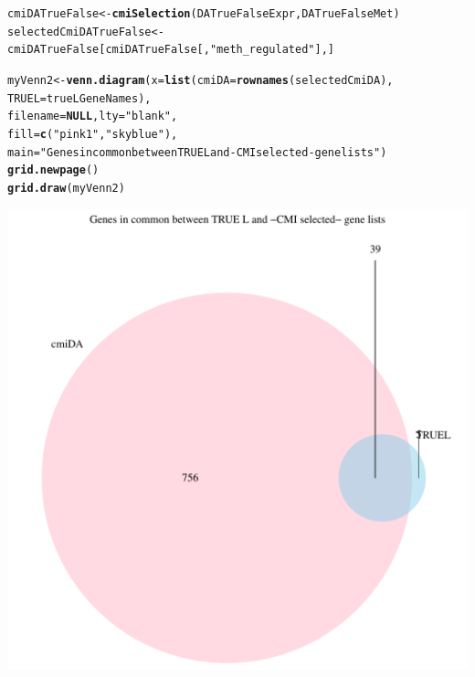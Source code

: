\documentclass[a4paper,10pt]{article}\usepackage[]{graphicx}\usepackage[]{color}
\makeatletter
\def\maxwidth{ %
  \ifdim\Gin@nat@width>\linewidth
    \linewidth
  \else
    \Gin@nat@width
  \fi
}
\newcommand{\hlstr}[1]{\textcolor[rgb]{0.192,0.494,0.8}{#1}}%
\newcommand{\hlstd}[1]{\textcolor[rgb]{0.345,0.345,0.345}{#1}}%
\newcommand{\hlkwa}[1]{\textcolor[rgb]{0.161,0.373,0.58}{\textbf{#1}}}%
\newcommand{\hlkwb}[1]{\textcolor[rgb]{0.69,0.353,0.396}{#1}}%
\newcommand{\hlkwc}[1]{\textcolor[rgb]{0.333,0.667,0.333}{#1}}%
\newcommand{\hlkwd}[1]{\textcolor[rgb]{0.737,0.353,0.396}{\textbf{#1}}}%
\newenvironment{kframe}{%
 \def\at@end@of@kframe{}%
 \ifinner\ifhmode%
  \def\at@end@of@kframe{\end{minipage}}%
  \begin{minipage}{\columnwidth}%
 \fi\fi%
 \def\FrameCommand##1{\hskip\@totalleftmargin \hskip-\fboxsep
 \colorbox{shadecolor}{##1}\hskip-\fboxsep
     \hskip-\linewidth \hskip-\@totalleftmargin \hskip\columnwidth}%
 \MakeFramed {\advance\hsize-\width
   \@totalleftmargin\z@ \linewidth\hsize
   \@setminipage}}%
 {\par\unskip\endMakeFramed%
 \at@end@of@kframe}
\newenvironment{knitrout}{}{} %
\makeatother
\begin{document}
\begin{knitrout}
\color{fgcolor}\begin{kframe}
\begin{alltt}
\hlstd{cmiDATrueFalse} \hlkwb{<-} \hlkwd{cmiSelection} \hlstd{(DATrueFalseExpr, DATrueFalseMet)}
\hlstd{selectedCmiDATrueFalse} \hlkwb{<-}\hlstd{cmiDATrueFalse[cmiDATrueFalse[,}\hlstr{"meth_regulated"}\hlstd{],]}

\hlstd{myVenn2}\hlkwb{<-} \hlkwd{venn.diagram}\hlstd{(}\hlkwc{x}\hlstd{=}\hlkwd{list}\hlstd{(}\hlkwc{cmiDA}\hlstd{=}\hlkwd{rownames}\hlstd{(selectedCmiDA),}
                              \hlkwc{TRUEL}\hlstd{=trueLGeneNames),}
                              \hlkwc{filename}\hlstd{=}\hlkwa{NULL}\hlstd{,} \hlkwc{lty} \hlstd{=} \hlstr{"blank"}\hlstd{,}
                              \hlkwc{fill}\hlstd{=}\hlkwd{c}\hlstd{(}\hlstr{"pink1"}\hlstd{,} \hlstr{"skyblue"}\hlstd{),}
                       \hlkwc{main}\hlstd{=}\hlstr{"Genes in common between TRUE L and -CMI selected- gene lists"}\hlstd{)}
\hlkwd{grid.newpage}\hlstd{()}
\hlkwd{grid.draw}\hlstd{(myVenn2)}
\end{alltt}
\end{kframe}
\includegraphics[width=\maxwidth]{figure/cmiSelTrue-1} 

\end{knitrout}
\end{document}
